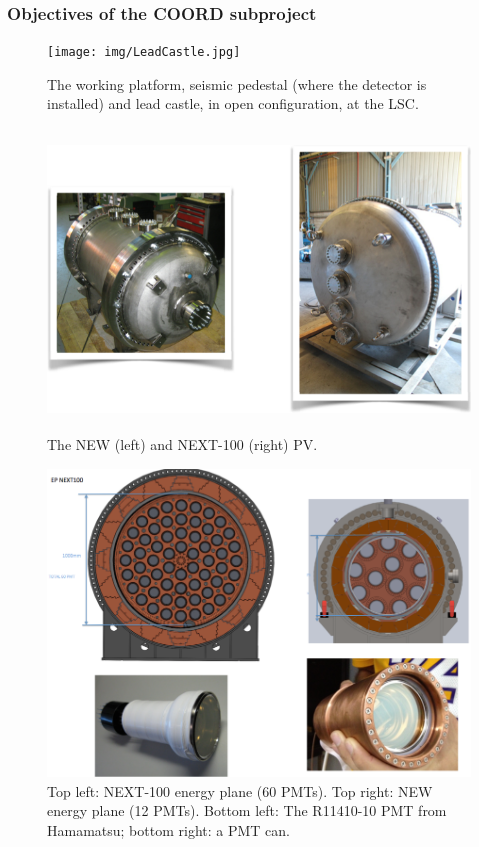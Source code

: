 %
%

\subsubsection*{Objectives of the COORD subproject}

\begin{figure}
\centering
\texttt{[image: img/LeadCastle.jpg]}
\caption{The working platform, seismic pedestal (where the detector is installed) and lead castle, in open configuration, at the LSC.} \label{fig:INFRA}
\end{figure}


\begin{figure}
\centering
\includegraphics[height=8cm]{img/PV.png}
\caption{The NEW (left) and NEXT-100 (right) PV.} \label{fig:PV}
\end{figure}

\begin{figure}[t!b!]
\begin{center}
\includegraphics[width=.9\textwidth]{img/EPNext-100.png}
\end{center}
\caption{Top left: NEXT-100 energy plane (60 PMTs). Top right: NEW energy plane (12 PMTs).
Bottom left: The R11410-10 PMT from Hamamatsu; bottom right: a PMT can.} \label{fig:EnergyPlane}
\end{figure}

